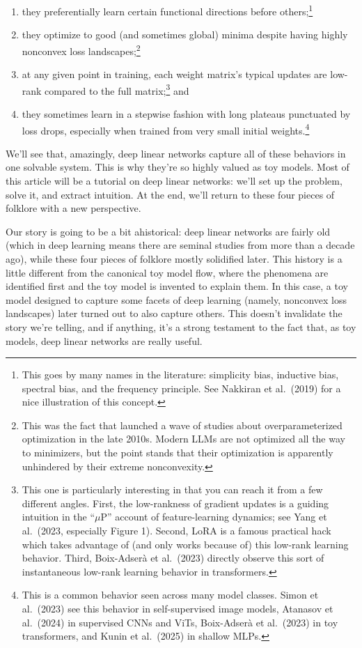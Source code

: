 \documentclass[12pt]{article}
\begin{document}
\begin{enumerate}
    \item they preferentially learn certain functional directions before others;\footnote{This goes by many names in the literature: simplicity bias, inductive bias, spectral bias, and the frequency principle. See Nakkiran et al.\ (2019) for a nice illustration of this concept.}
    \item they optimize to good (and sometimes global) minima despite having highly nonconvex loss landscapes;\footnote{This was the fact that launched a wave of studies about overparameterized optimization in the late 2010s. Modern LLMs are not optimized all the way to minimizers, but the point stands that their optimization is apparently unhindered by their extreme nonconvexity.}
    \item at any given point in training, each weight matrix's typical updates are low-rank compared to the full matrix;\footnote{This one is particularly interesting in that you can reach it from a few different angles. First, the low-rankness of gradient updates is a guiding intuition in the ``$\mu$P'' account of feature-learning dynamics; see Yang et al.\ (2023, especially Figure 1). Second, LoRA is a famous practical hack which takes advantage of (and only works because of) this low-rank learning behavior. Third, Boix-Adser\`{a} et al.\ (2023) directly observe this sort of instantaneous low-rank learning behavior in transformers.} and
    \item they sometimes learn in a stepwise fashion with long plateaus punctuated by loss drops, especially when trained from very small initial weights.\footnote{This is a common behavior seen across many model classes. Simon et al.\ (2023) see this behavior in self-supervised image models, Atanasov et al.\ (2024) in supervised CNNs and ViTs, Boix-Adser\`{a} et al.\ (2023) in toy transformers, and Kunin et al.\ (2025) in shallow MLPs.}
\end{enumerate}

We'll see that, amazingly, deep linear networks capture all of these behaviors in one solvable system. This is why they're so highly valued as toy models. Most of this article will be a tutorial on deep linear networks: we'll set up the problem, solve it, and extract intuition. At the end, we'll return to these four pieces of folklore with a new perspective.

Our story is going to be a bit ahistorical: deep linear networks are fairly old (which in deep learning means there are seminal studies from more than a decade ago), while these four pieces of folklore mostly solidified later. This history is a little different from the canonical toy model flow, where the phenomena are identified first and the toy model is invented to explain them. In this case, a toy model designed to capture some facets of deep learning (namely, nonconvex loss landscapes) later turned out to also capture others. This doesn't invalidate the story we're telling, and if anything, it's a strong testament to the fact that, as toy models, deep linear networks are really useful.
\end{document}
